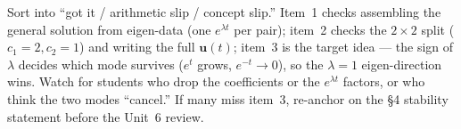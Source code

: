 \documentclass[10pt]{article}
\newcommand{\uu}{\mathbf{u}}
\begin{document}
\begin{teachernote}
Sort into ``got it / arithmetic slip / concept slip.'' Item~1 checks assembling the general solution from
eigen-data (one $e^{\lambda t}$ per pair); item~2 checks the $2\times2$ split ($c_1=2,c_2=1$) and writing the
full $\uu(t)$; item~3 is the target idea --- the sign of $\lambda$ decides which mode survives ($e^{t}$ grows,
$e^{-t}\to0$), so the $\lambda=1$ eigen-direction wins. Watch for students who drop the coefficients or the
$e^{\lambda t}$ factors, or who think the two modes ``cancel.'' If many miss item~3, re-anchor on the \S4
stability statement before the Unit~6 review.
\end{teachernote}
\end{document}

